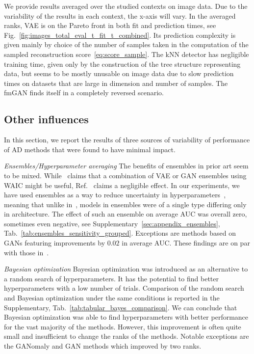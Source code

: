 We provide results averaged over the studied contexts on image data. Due to the variability of the results in each context, the x-axis will vary. In the averaged ranks, VAE is on the Pareto front in both fit and prediction times, see Fig.~\ref{fig:images_total_eval_t_fit_t_combined}. Its prediction complexity is given mainly by choice of the number of samples taken in the computation of the sampled reconstruction score~\eqref{eq:score_sample}. The kNN detector has negligible training time, given only by the construction of the tree structure representing data, but seems to be mostly unusable on image data due to slow prediction times on datasets that are large in dimension and number of samples. The fmGAN finds itself in a completely reversed scenario.

\subsection{Other influences}
\label{sec:other_context}
In this section, we report the results of three sources of variability of performance of AD methods that were found to have minimal impact.

\emph{Ensembles/Hyperparameter averaging} The benefits of ensembles in prior art seem to be mixed. While~\cite{choiWAICWhyGenerative2019} claims that a combination of VAE or GAN ensembles using WAIC might be useful, Ref.~\cite{nalisnickDeepGenerativeModels2019} claims a negligible effect. In our experiments, we have used ensembles as a way to reduce uncertainty in hyperparameters~\cite{wilson2020case}, meaning that unlike in~\cite{choiWAICWhyGenerative2019}, models in ensembles were of a single type differing only in architecture. The effect of such an ensemble on average AUC was overall zero, sometimes even negative, see Supplementary~\ref{sec:appendix_ensembles}, Tab.~\ref{tab:ensembles_sensitivity_grouped}. Exceptions are methods based on GANs featuring improvements by $0.02$ in average AUC. These findings are on par with those in~\cite{nalisnickDeepGenerativeModels2019}.

\emph{Bayesian optimization} Bayesian optimization was introduced as an alternative to a random search of hyperparameters. It has the potential to find better hyperparameters with a low number of trials. Comparison of the random search and Bayesian optimization under the same conditions is reported in the Supplementary, Tab.~\ref{tab:tabular_bayes_comparison}. We can conclude that Bayesian optimization was able to find hyperparameters with better performance for the vast majority of the methods. However, this improvement is often quite small and insufficient to change the ranks of the methods. Notable exceptions are the GANomaly and GAN methods which improved by two ranks. 


